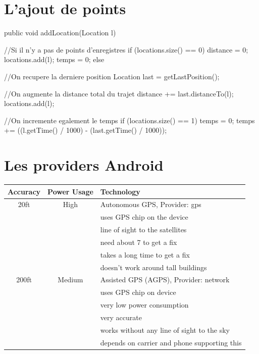 \begin{appendices}
\chapter{L'ajout de points}

\label{Annexe1}
\begin{java}  
public void addLocation(Location l) {
	//Si il n'y a pas de points d'enregistres
	if (locations.size() == 0) {
		distance = 0;
		locations.add(l);
		temps = 0;
	} else {
	
	//On recupere la derniere position 
	Location last = getLastPosition();
	
	//On augmente la distance total du trajet 
	distance += last.distanceTo(l);
	locations.add(l);
 	
 	//On incremente egalement le temps 
	if (locations.size() == 1) {
		temps = 0;
	} 
	temps += ((l.getTime() / 1000) - (last.getTime() / 1000));   
	}
}
\end{java}

\chapter{Les providers Android}
\label{Annexe2}
\begin{table}[H]
\begin{center}
   \begin{tabular}{| c | c | l | }
     \hline
     Accuracy & Power Usage & Technology \\ \hline
     20ft & High & Autonomous GPS, Provider: gps \\ 
     && uses GPS chip on the device \\
     && line of sight to the satellites \\
     && need about 7 to get a fix \\
     && takes a long time to get a fix \\
     && doesn’t work around tall buildings \\ \hline
 
     200ft & Medium & Assisted GPS (AGPS), Provider: network \\ 
     && uses GPS chip on device \\
	 && very low power consumption \\
	 && very accurate \\
	 && works without any line of sight to the sky \\
	 && depends on carrier and phone supporting this \\ \hline
    

\end{tabular}
\end{center}
\end{table}
\end{appendices}
